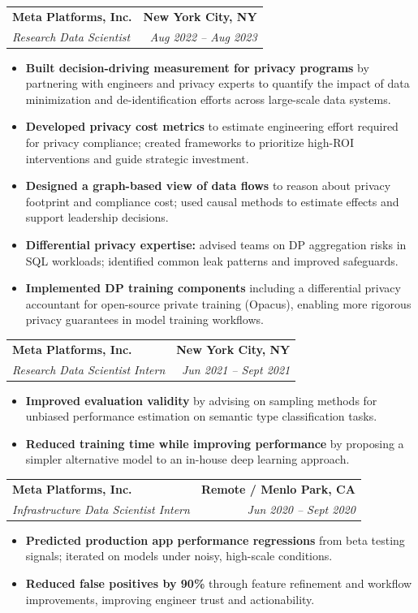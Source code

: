 \documentclass[letterpaper,10pt]{article}
\newcommand{\resumeItem}[1]{
  \item \small{#1 \vspace{-2pt}}
}
\newcommand{\resumeSubheading}[4]{
  \vspace{-1pt}\item
  \begin{tabularx}{\textwidth}{X r}
    \textbf{#1} & \textbf{#2} \\
    \textit{\small #3} & \textit{\small #4} \\
  \end{tabularx}\vspace{-6pt}
}
\newcommand{\resumeItemListStart}{\begin{itemize}[leftmargin=*, itemsep=2pt, topsep=2pt]}
\newcommand{\resumeItemListEnd}{\end{itemize}\vspace{-6pt}}
\begin{document}
  \resumeSubheading
    {Meta Platforms, Inc.}{New York City, NY}
    {Research Data Scientist}{Aug 2022 -- Aug 2023}
    \resumeItemListStart
      \resumeItem{\textbf{Built decision-driving measurement for privacy programs} by partnering with engineers and privacy experts to quantify the impact of data minimization and de-identification efforts across large-scale data systems.}
      \resumeItem{\textbf{Developed privacy cost metrics} to estimate engineering effort required for privacy compliance; created frameworks to prioritize high-ROI interventions and guide strategic investment.}
      \resumeItem{\textbf{Designed a graph-based view of data flows} to reason about privacy footprint and compliance cost; used causal methods to estimate effects and support leadership decisions.}
      \resumeItem{\textbf{Differential privacy expertise:} advised teams on DP aggregation risks in SQL workloads; identified common leak patterns and improved safeguards.}
      \resumeItem{\textbf{Implemented DP training components} including a differential privacy accountant for open-source private training (Opacus), enabling more rigorous privacy guarantees in model training workflows.}
    \resumeItemListEnd

  \resumeSubheading
    {Meta Platforms, Inc.}{New York City, NY}
    {Research Data Scientist Intern}{Jun 2021 -- Sept 2021}
    \resumeItemListStart
      \resumeItem{\textbf{Improved evaluation validity} by advising on sampling methods for unbiased performance estimation on semantic type classification tasks.}
      \resumeItem{\textbf{Reduced training time while improving performance} by proposing a simpler alternative model to an in-house deep learning approach.}
    \resumeItemListEnd

  \resumeSubheading
    {Meta Platforms, Inc.}{Remote / Menlo Park, CA}
    {Infrastructure Data Scientist Intern}{Jun 2020 -- Sept 2020}
    \resumeItemListStart
      \resumeItem{\textbf{Predicted production app performance regressions} from beta testing signals; iterated on models under noisy, high-scale conditions.}
      \resumeItem{\textbf{Reduced false positives by \raisebox{0.2ex}{\small\textasciitilde}90\%} through feature refinement and workflow improvements, improving engineer trust and actionability.}
    \resumeItemListEnd
\end{document}

